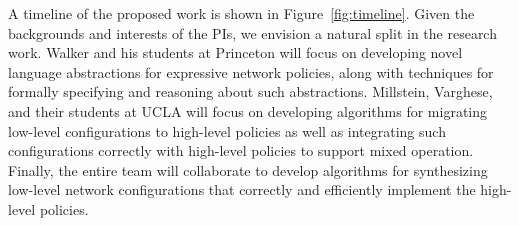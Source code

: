 \documentclass[12pt]{article}
\begin{document}
A timeline of the proposed work is shown in Figure~\ref{fig:timeline}.  Given the backgrounds and interests of the PIs, we envision a natural
split in the research work.  Walker and his students at Princeton will focus on developing novel language abstractions for expressive network policies, along with techniques for formally specifying and reasoning about such abstractions.  
Millstein, Varghese, and their students at UCLA will focus on developing algorithms for migrating low-level configurations to high-level policies as well as integrating such configurations correctly with high-level policies to support mixed operation. Finally, the entire team will collaborate to develop algorithms for synthesizing low-level network configurations that correctly and efficiently implement the high-level policies. 
\end{document}
